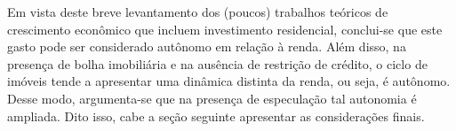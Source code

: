 Em vista deste breve levantamento dos (poucos) trabalhos teóricos de crescimento econômico que incluem investimento residencial, conclui-se que este gasto pode ser considerado autônomo em relação à renda.
Além disso, na presença de bolha imobiliária e na ausência de restrição de crédito, o ciclo de imóveis tende a apresentar uma dinâmica distinta da renda, ou seja, é autônomo.
Desse modo, argumenta-se que na presença de especulação tal autonomia é ampliada. 
Dito isso, cabe a seção seguinte apresentar as considerações finais.





\begin{comment}






Feita esta descrição, Duesenberry pontua: (i) a flutuação dos imóveis decorrente de um desequilíbrio inicial é amortecida; (ii) a flutuação da renda causará flutuações no investimento residencial com defasagem; (iii) este setor possui demanda de reserva e, portanto, os efeitos de uma recessão nesse setor são mais dispersos ao longo do tempo que, por sua vez, contribui para que a perda de dinamismo da renda seja atenuado.

\end{comment}